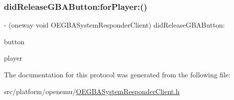 \subsubsection{\texorpdfstring{did\+Release\+G\+B\+A\+Button\+:for\+Player\+:()}{didReleaseGBAButton:forPlayer:()}}
{\footnotesize\ttfamily -\/ (oneway void O\+E\+G\+B\+A\+System\+Responder\+Client) did\+Release\+G\+B\+A\+Button\+: \begin{DoxyParamCaption}\item[{(\mbox{\hyperlink{_o_e_g_b_a_system_responder_client_8h_a3173f3f7a492b23738cf660b6b90ae00}{O\+E\+G\+B\+A\+Button}})}]{button }\item[{forPlayer:(N\+S\+U\+Integer)}]{player }\end{DoxyParamCaption}}



The documentation for this protocol was generated from the following file\+:\begin{DoxyCompactItemize}
\item 
src/platform/openemu/\mbox{\hyperlink{_o_e_g_b_a_system_responder_client_8h}{O\+E\+G\+B\+A\+System\+Responder\+Client.\+h}}\end{DoxyCompactItemize}
